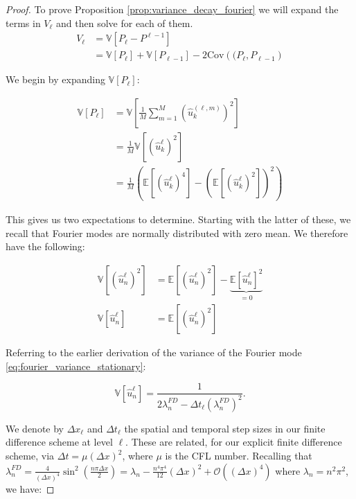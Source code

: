 \begin{proof}
    To prove Proposition \ref{prop:variance_decay_fourier} we will expand the terms in
    $V_\ell$ and then 
    solve for each of them.
    \begin{align*}
    V_\ell &= \mathbb{V}[P_\ell - P^{\ell - 1}]\\
    &= \mathbb{V}[P_\ell] + 
        \mathbb{V}[P_{\ell-1}] - 
        2 \mathrm{Cov}\left((P_\ell, P_{\ell - 1}\right)
    \end{align*}

    We begin by expanding $\mathbb{V}[P_\ell]$:

    \begin{align*}
        \mathbb{V}[P_\ell] &= 
        \mathbb{V}\left[\frac{1}{M}\sum_{m=1}^M
        \left(\hat{u}_k^{(\ell, m)}\right)^2\right] \\
        &= \frac{1}{M}\mathbb{V}\left[ (\hat{u}_k^\ell)^2 \right]\\
        &= \frac{1}{M}\left(\mathbb{E}[(\hat{u}_k^\ell)^4] 
        - \left(\mathbb{E}[(\hat{u}_k^\ell)^2]\right)^2\right)
    \end{align*}

    This gives us two expectations to determine. 
    Starting with the latter of these, we recall that 
    Fourier modes are normally distributed with 
    zero mean.
    We therefore have the following:

    \begin{align*}
        \mathbb{V}[(\hat{u}_n^\ell)^2] &= 
        \mathbb{E}[(\hat{u}_n^\ell)^2] - 
        \underbrace{\mathbb{E}[\hat{u}_n^\ell]^2}_{=0}\\
        \mathbb{V}[\hat{u}_n^\ell] &= \mathbb{E}[(\hat{u}_n^\ell)^2]
    \end{align*}

    Referring to the earlier derivation of the variance 
    of the Fourier mode \eqref{eq:fourier_variance_stationary}:
    
    \begin{equation}\label{eq:fourier_mode_var}
        \mathbb{V}[\hat{u}_n^\ell] = \frac{1}{2 \lambda_n^{FD} - 
        \Delta t_\ell (\lambda_n^{FD})^2}.
    \end{equation}

    We denote by $\Delta x_\ell$ and $\Delta t_\ell$ the spatial
    and temporal step sizes in our finite difference scheme at level 
    $\ell$.
    These are related, for our explicit finite difference scheme,
    via $\Delta t = \mu (\Delta x)^2$, where $\mu$ is the CFL
    number. Recalling that $\lambda_n^{FD} = \frac{4}{(\Delta x)^4} 
    \sin^2\left(\frac{n \pi \Delta x}{2}\right) = \lambda_n - 
    \frac{n^4 \pi^4}{12}(\Delta x)^2 + \mathcal{O}((\Delta x)^4)$
    where $\lambda_n = n^2 \pi^2$, we have:


\end{proof}
